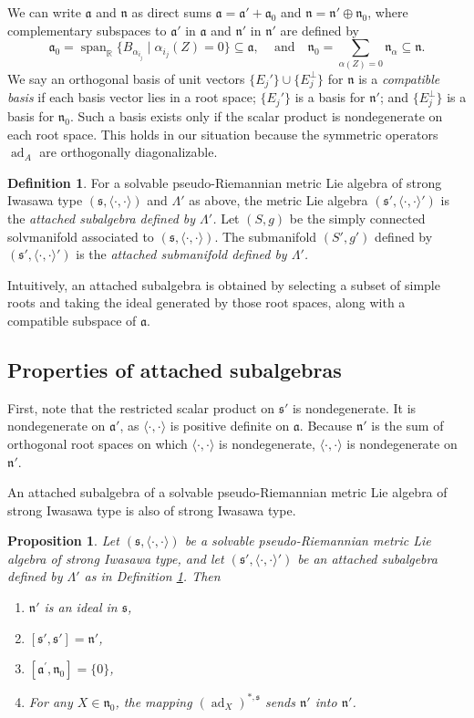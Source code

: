 \documentclass[12pt]{amsart}
\newcommand\R{\mathbb R}
\newcommand{\myspan}{\operatorname{span}}
\newcommand{\fraka}{\ensuremath{\mathfrak{a}} }
\newcommand{\frakn}{\ensuremath{\mathfrak{n}} }
\newcommand{\fraks}{\ensuremath{\mathfrak{s}} }
\renewcommand\a{{\mathfrak{a}}}
\newcommand\n{{\mathfrak{n}}}
\newcommand\s{{\mathfrak{s}}}
\newcommand\ip{{\langle\cdot {,} \cdot\rangle}}
\newcommand\ad{\operatorname{ad}}
\theoremstyle{plain}
\newtheorem{prop}[theorem]{Proposition}
\theoremstyle{definition}
\newtheorem{definition}[theorem]{Definition}
\theoremstyle{remark}
\numberwithin{equation}{section}
\numberwithin{theorem}{section}
\begin{document}
We can write $\fraka$ and $\frakn$ as direct sums $\fraka = \fraka' + \fraka_0$ and $\frakn = \frakn' \oplus \frakn_0$, where complementary
subspaces to $\fraka'$ in $\fraka$ and $\frakn'$ in $\frakn'$ are
defined by
 \[
 \a_0 = 
  \myspan_{\R}\{B_{\alpha_{i_j}} \mid \alpha_{i_j}(Z)=0  \}  \subseteq \a, \quad \, \text{and} \quad
  \n_0 = \sum_{\alpha(Z)=0} \n_{\alpha} \subseteq \n.
\]
We say an orthogonal basis of unit vectors $\{E_j'\} \cup \{E_j^\perp\}$ 
for $\frakn$ is a {\em compatible basis} if each basis vector lies in 
a root space;  $\{E_j'\}$ is a basis for 
$\frakn'$; and $\{E_j^\perp\}$ is a basis for $\frakn_0$.  
Such a basis exists only if the scalar product is nondegenerate on each root space. This holds in our situation because the symmetric operators $\ad_A$ are orthogonally diagonalizable.
\begin{definition}\label{defn: attached} 
For a solvable pseudo-Riemannian metric  Lie algebra of strong Iwasawa 
type $(\s, \ip)$ and $\Lambda'$ as above,  the metric Lie algebra 
$(\s', \ip')$ is  the {\em attached subalgebra defined by $\Lambda'$.}  
Let $(S,g)$ be the simply connected  solvmanifold  associated to 
$(\s, \ip)$.  The submanifold $(S',g')$ defined by $(\s', \ip')$ is 
the {\em attached submanifold defined by $\Lambda'$. } 
\end{definition}
Intuitively, an attached subalgebra is obtained by selecting a 
subset of simple roots and taking  the ideal generated by those root spaces, 
along with a compatible subspace of 
$\fraka.$
\subsection{Properties of attached subalgebras}
First, note that the restricted scalar product on $\fraks'$ is nondegenerate. 
It is nondegenerate on $\fraka'$, as $\ip$ is positive definite  on $\fraka.$ 
Because $\frakn'$ is the sum of orthogonal root spaces on which $\ip$ is nondegenerate,
$\ip$ is nondegenerate on $\frakn'.$  

An attached subalgebra of a solvable  pseudo-Riemannian metric Lie algebra of strong
Iwasawa type is also of strong Iwasawa type.
\begin{prop}\label{prop: alg properties} 
Let $(\fraks,\ip)$ be a solvable pseudo-Riemannian metric  Lie algebra of strong Iwasawa
type, and let  $(\s', \ip')$ be an attached subalgebra defined by $\Lambda'$ as in
Definition \ref{defn: attached}. 
Then
\begin{enumerate}
\item{$\n'$ is an ideal in $\s$,}
\item{$[\s',\s']= \n'$,}
\item{$[\fraka^\prime, \frakn_0] = \{0\}$, }
\item{For any $X \in \n_0$, the mapping $(\ad_X)^{\ast,\fraks}$ sends $\frakn'$ 
into $\n'$.} 
\end{enumerate}
\end{prop}
\end{document}
